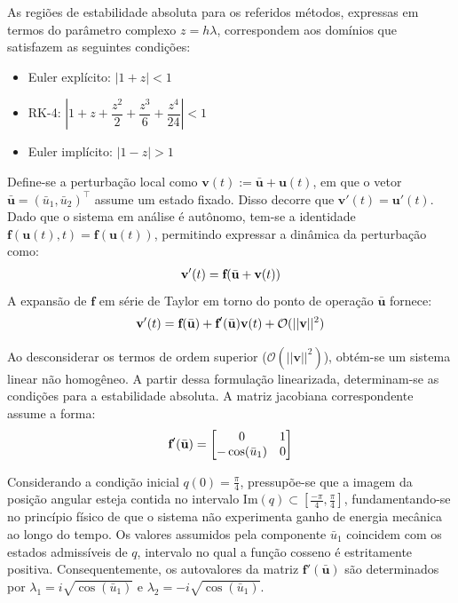 \documentclass[12pt,a4paper]{article}
\newcommand{\bd}[1]{\textbf{#1}} %
\newcommand{\bb}[1]{\bar{\textbf{#1}}} %
\begin{document}
    As regiões de estabilidade absoluta para os referidos métodos, expressas em termos do parâmetro complexo $z = h\lambda$, correspondem aos domínios que satisfazem as seguintes condições:
    \begin{itemize}
        \item Euler explícito: $|1+z| < 1$
        \item RK-4: $\left|1 + z + \dfrac{z^2}{2} + \dfrac{z^3}{6} + \dfrac{z^4}{24}\right| < 1$
        \item Euler implícito: $|1-z| > 1$
    \end{itemize}
    
    Define-se a perturbação local como $\bd{v}(t) := \bb{u} + \bd{u}(t)$, em que o vetor $\bb{u} = (\bar{u}_1, \bar{u}_2)^\top$ assume um estado fixado. Disso decorre que $\bd{v}'(t) = \bd{u}'(t)$. Dado que o sistema em análise é autônomo, tem-se a identidade $\bd{f}(\bd{u}(t), t) = \bd{f}(\bd{u}(t))$, permitindo expressar a dinâmica da perturbação como:
    \begin{align}
        \bd{v}'(t) = \bd{f}(\bb{u} + \bd{v}(t)) \notag
    \end{align}
    A expansão de $\bd{f}$ em série de Taylor em torno do ponto de operação $\bb{u}$ fornece:
    \begin{align}
        \bd{v}'(t) = \bd{f}(\bb{u}) + \bd{f}'(\bb{u})\bd{v}(t) + \mathcal{O}(||\bd{v}||^2) \notag
    \end{align}

    Ao desconsiderar os termos de ordem superior ($\mathcal{O}(||\bd{v}||^2)$), obtém-se um sistema linear não homogêneo. A partir dessa formulação linearizada, determinam-se as condições para a estabilidade absoluta. A matriz jacobiana correspondente assume a forma:
    \begin{align}
        \bd{f}'(\bb{u}) = \begin{bmatrix}
            0 & 1 \\
            -\cos(\bar{u}_1) & 0
        \end{bmatrix} \notag
    \end{align}

    Considerando a condição inicial $q(0) = \frac{\pi}{4}$, pressupõe-se que a imagem da posição angular esteja contida no intervalo $\text{Im}(q) \subset \left[\frac{-\pi}{4}, \frac{\pi}{4}\right]$, fundamentando-se no princípio físico de que o sistema não experimenta ganho de energia mecânica ao longo do tempo. Os valores assumidos pela componente $\bar{u}_1$ coincidem com os estados admissíveis de $q$, intervalo no qual a função cosseno é estritamente positiva. Consequentemente, os autovalores da matriz $\bd{f}'(\bb{u})$ são determinados por $\lambda_1 = i \sqrt{\cos(\bar{u}_1)}$ e $\lambda_2 = -i \sqrt{\cos(\bar{u}_1)}$. 
\end{document}
